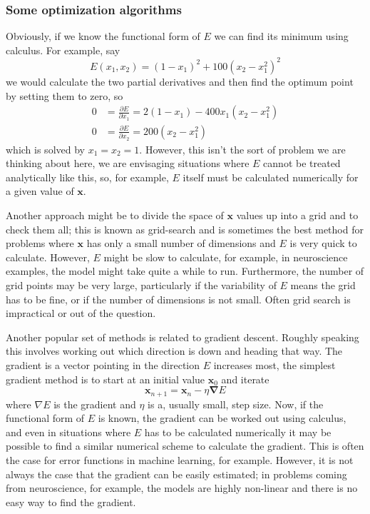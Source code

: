 \documentclass[11pt,a4paper]{scrartcl}
\begin{document}
\subsubsection*{Some optimization algorithms}

Obviously, if we know the functional form of $E$ we can find its minimum
using calculus. For example, say
\begin{equation}
E(x_1,x_2)=(1-x_1)^2+100(x_2-x_1^2)^2
\end{equation}
we would calculate the two partial derivatives and then find the
optimum point by setting them to zero, so
\begin{equation}
\begin{aligned}
0&=\frac{\partial E}{\partial x_1}=2(1-x_1)-400x_1(x_2-x_1^2)\\
0&=\frac{\partial E}{\partial x_2}=200(x_2-x_1^2)
\end{aligned}
\end{equation}
which is solved by $x_1=x_2=1$. However, this isn't the sort of
problem we are thinking about here, we are envisaging situations where
$E$ cannot be treated analytically like this, so, for example, $E$
itself must be calculated numerically for a given value of
$\mathbf{x}$.

Another approach might be to divide the space of $\mathbf{x}$ values
up into a grid and to check them all; this is known as grid-search and
is sometimes the best method for problems where $\mathbf{x}$ has only
a small number of dimensions and $E$ is very quick to
calculate. However, $E$ might be slow to calculate, for example, in
neuroscience examples, the model might take quite a while to
run. Furthermore, the number of grid points may be very large,
particularly if the variability of $E$ means the grid has to be fine,
or if the number of dimensions is not small. Often grid search is
impractical or out of the question.

Another popular set of methods is related to gradient descent. Roughly
speaking this involves working out which direction is down and heading
that way. The gradient is a vector pointing in the direction $E$
increases most, the simplest gradient method is to start at an initial
value $\mathbf{x}_0$ and iterate
\begin{equation}
\mathbf{x}_{n+1}=\mathbf{x}_n-\eta \mathbf{\nabla}E
\end{equation}
where ${\nabla}E$ is the gradient and $\eta$ is a, usually small, step
size. Now, if the functional form of $E$ is known, the gradient can be
worked out using calculus, and even in situations where $E$ has to be
calculated numerically it may be possible to find a similar numerical
scheme to calculate the gradient. This is often the case for error
functions in machine learning, for example. However, it is not always
the case that the gradient can be easily estimated; in problems coming
from neuroscience, for example, the models are highly non-linear and
there is no easy way to find the gradient.
\end{document}
